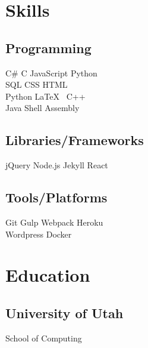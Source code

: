 \documentclass[]{plushcv}
\begin{document}
\hfill
\begin{minipage}[t]{0.25\textwidth}


  \section{Skills}
  \subsection{Programming}
  \sectionsep
  C\# \textbullet{} C \textbullet{} JavaScript \textbullet{} Python    \\ SQL \textbullet{} CSS \textbullet{} HTML \textbullet{} \\
  \sectionsep
  Python \textbullet{} \LaTeX\ \textbullet{}  C++  \\
  \sectionsep
  Java \textbullet{}  Shell \textbullet{} Assembly \\
  \sectionsep
  \sectionsep
  \subsection{Libraries/Frameworks}
  \sectionsep
  jQuery \textbullet{} Node.js \textbullet{} Jekyll \textbullet{} React \\
  \sectionsep
  \sectionsep
  \subsection{Tools/Platforms}
  \sectionsep
  Git \textbullet{} Gulp \textbullet{} Webpack \textbullet{} Heroku    \\ Wordpress \textbullet{} Docker \\

  \sectionsep


  \section{Education}
  \subsection{University of Utah}
  School of Computing \\


\end{minipage}
\end{document}
